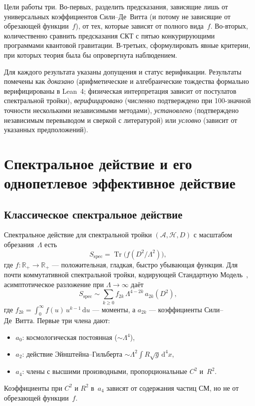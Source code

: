 \documentclass[12pt,a4paper]{article}
\theoremstyle{plain}
\theoremstyle{definition}
\theoremstyle{remark}
\newcommand{\dd}{\mathrm{d}}
\newcommand{\Tr}{\operatorname{Tr}}
\begin{document}
Цели работы три. Во-первых, разделить предсказания, зависящие лишь
от универсальных коэффициентов Сили--Де~Витта (и потому не зависящие
от обрезающей функции~$f$), от тех, которые зависят от полного
вида~$f$. Во-вторых, количественно сравнить предсказания СКТ с пятью
конкурирующими программами квантовой гравитации. В-третьих,
сформулировать явные критерии, при которых теория была бы
опровергнута наблюдением.

Для каждого результата указаны допущения и статус верификации.
Результаты помечены как \emph{доказано} (арифметические и
алгебраические тождества формально верифицированы в Lean~4;
физическая интерпретация зависит от постулатов спектральной тройки),
\emph{верифицировано} (численно подтверждено при 100-значной точности
несколькими независимыми методами), \emph{установлено} (подтверждено
независимым перевыводом и сверкой с литературой) или \emph{условно}
(зависит от указанных предположений).

\section{Спектральное действие и его однопетлевое эффективное действие}
\label{sec:action}

\subsection{Классическое спектральное действие}
\label{sec:classical}

Спектральное действие для спектральной тройки $(\mathcal{A},
\mathcal{H}, D)$ с масштабом обрезания~$\Lambda$
есть~\cite{CC:1996,CC:1997}
\begin{equation}\label{eq:spec-action}
  S_{\mathrm{spec}} = \Tr\bigl(f(D^2/\Lambda^2)\bigr),
\end{equation}
где $f \colon \mathbb{R}_+ \to \mathbb{R}_+$ --- положительная,
гладкая, быстро убывающая функция. Для почти коммутативной
спектральной тройки, кодирующей Стандартную
Модель~\cite{CCM:2006}, асимптотическое разложение при
$\Lambda \to \infty$ даёт~\cite{Vassilevich:2003}
\begin{equation}\label{eq:heat-expansion}
  S_{\mathrm{spec}} \sim \sum_{k \geq 0}
  f_{2k}\, \Lambda^{4-2k}\, a_{2k}(D^2),
\end{equation}
где $f_{2k} = \int_0^\infty f(u)\, u^{k-1}\, \dd u$ --- моменты,
а $a_{2k}$ --- коэффициенты Сили--Де~Витта. Первые три члена дают:
\begin{itemize}
  \item $a_0$: космологическая постоянная ($\sim \Lambda^4$),
  \item $a_2$: действие Эйнштейна--Гильберта
    $\sim \Lambda^2 \int R \sqrt{g}\, \dd^4 x$,
  \item $a_4$: члены с высшими производными, пропорциональные
    $C^2$ и~$R^2$.
\end{itemize}
Коэффициенты при $C^2$ и $R^2$ в~$a_4$ зависят от содержания частиц
СМ, но не от обрезающей функции~$f$.
\end{document}
